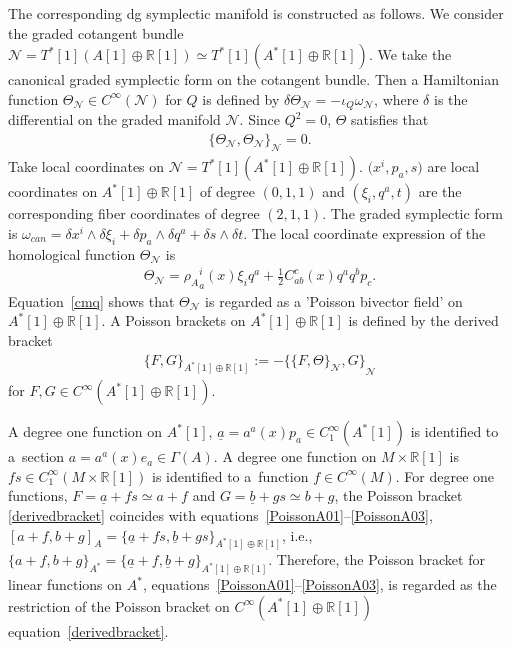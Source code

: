 \documentclass[pdftex]{sigma}
\numberwithin{equation}{section}
\def\bR{{\mathbb{R}}}
\newcommand{\calN}{{\mathcal N}}
\newcommand{\sbv}[2]{{\{{{#1},{#2}}\}}}
\newcommand{\rhoa}{{\rho_A}}
\newcommand{\omegac}{{\omega_{can}}}
\newcommand{\Thetan}{{\Theta_{\calN}}}
\newcommand{\ua}{{\underline{a}}{}}
\newcommand{\ub}{{\underline{b}}{}}
\begin{document}
The corresponding dg symplectic manifold is constructed as follows.
We consider the graded cotangent bundle
$\calN = T^*[1](A[1] \oplus \bR[1]) \simeq T^*[1](A^*[1] \oplus \bR[1])$.
We take the canonical graded symplectic form on the cotangent bundle.
Then a Hamiltonian function
$\Thetan \in C^{\infty}(\calN)$ for $Q$ is defined by
$
\delta \Thetan = - \iota_Q \omega_{\calN}$,
where $\delta$ is the differential on the graded manifold $\calN$.
Since $Q^2=0$, $\Theta$ satisfies that
\begin{gather}
\sbv{\Thetan}{\Thetan}_{\calN} =0.
\label{cmq}
\end{gather}
Take local coordinates on $\calN = T^*[1](A^*[1] \oplus \bR[1]) $.
$\bigl(x^i, p_a, s\bigr)$ are local coordinates on $A^*[1] \oplus \bR[1]$ of degree $(0, 1, 1)$
and $(\xi_i, q^a, t)$ are the corresponding fiber coordinates
of degree $(2, 1, 1)$.
The graded symplectic form is
$
\omegac = \delta x^i \wedge \delta \xi_i + \delta p_a \wedge \delta q^a
+ \delta s \wedge \delta t$.
The local coordinate expression of the homological function $\Thetan$ is
\begin{gather}
\Thetan =
\rhoa^i_a(x) \xi_i q^a + \frac{1}{2} C_{ab}^c(x) q^a q^b p_c.
\label{homologicalN}
\end{gather}
Equation~\eqref{cmq} shows that $\Thetan$ is regarded as a
'Poisson bivector field' on $A^*[1] \oplus \bR[1]$.
A Poisson brackets on $A^*[1] \oplus \bR[1]$ is defined by the derived bracket
\begin{gather}
\{F, G \}_{A^*[1] \oplus \bR[1]} := - \sbv{\sbv{F}{\Theta}_{\calN}}{G}_{\calN}
\label{derivedbracket}
\end{gather}
for $F, G \in C^{\infty}(A^*[1] \oplus \bR[1])$.

A degree one function on $A^*[1]$, $\ua = a^a(x) p_a \in C_1^{\infty}(A^*[1])$
is identified to a~section $a = a^a(x) e_a \in \Gamma(A)$.
A degree one function on $M \times \bR[1]$ is $f s \in C_1^{\infty}(M \times \bR[1])$ is identified to a~function $f \in C^{\infty}(M)$.
For degree one functions,
$F = \ua + fs \simeq a + f$ and $G = \ub + gs \simeq b + g$,
the Poisson bracket \eqref{derivedbracket} coincides with
equations~\eqref{PoissonA01}--\eqref{PoissonA03},
$
[a + f, b + g]_{A}
= \{\ua + fs, \ub + gs \}_{A^*[1] \oplus \bR[1]}$,
i.e., $\sbv{a + f}{b + g}_{A^*}= \{\ua + f, \ub + g \}_{A^*[1] \oplus \bR[1]}$.
Therefore, the Poisson bracket for linear functions on $A^*$,
equations~\eqref{PoissonA01}--\eqref{PoissonA03}, is regarded as
the restriction of the Poisson bracket on $C^{\infty}({A^*[1] \oplus \bR[1]})$
equation~\eqref{derivedbracket}.
\end{document}
